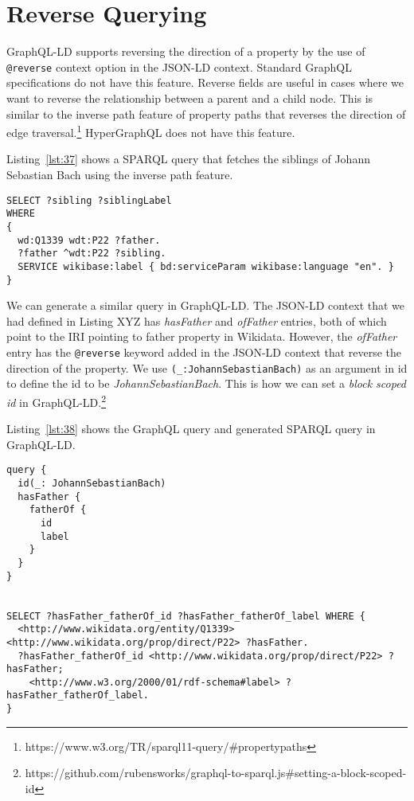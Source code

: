 \section{Reverse Querying}
\label{sec:reverse}
GraphQL-LD supports reversing the direction of a property by the use of \texttt{@reverse} context option in the JSON-LD context. Standard GraphQL specifications do not have this feature. Reverse fields are useful in cases where we want to reverse the relationship between a parent and a child node. This is similar to the inverse path feature of property paths that reverses the direction of edge traversal.\footnote{https://www.w3.org/TR/sparql11-query/\#propertypaths} HyperGraphQL does not have this feature.

Listing~\ref{lst:37} shows a SPARQL query that fetches the siblings of Johann Sebastian Bach using the inverse path feature.

\begin{minipage}{\linewidth}
\begin{lstlisting}[label=lst:37, caption={SPARQL query showing usage of inverse path}, language=SPARQL]
SELECT ?sibling ?siblingLabel
WHERE
{
  wd:Q1339 wdt:P22 ?father.
  ?father ^wdt:P22 ?sibling.
  SERVICE wikibase:label { bd:serviceParam wikibase:language "en". }
}
\end{lstlisting}
\end{minipage}

We can generate a similar query in GraphQL-LD. The JSON-LD context that we had defined in Listing XYZ has \textit{hasFather} and \textit{ofFather} entries, both of which point to the IRI pointing to father property in Wikidata. However, the \textit{ofFather} entry has the \texttt{@reverse} keyword added in the JSON-LD context that reverse the direction of the property. We use \texttt{(\_:JohannSebastianBach)} as an argument in id to define the id to be \textit{JohannSebastianBach}. This is how we can set a \textit{block scoped id} in GraphQL-LD.\footnote{https://github.com/rubensworks/graphql-to-sparql.js\#setting-a-block-scoped-id}

Listing~\ref{lst:38} shows the GraphQL query and generated SPARQL query in GraphQL-LD.

\begin{minipage}{\linewidth}
\begin{lstlisting}[columns=fullflexible, label=lst:38, caption={GraphQL query and generated SPARQL query in GraphQL-LD}, language=SPARQL]
query {
  id(_: JohannSebastianBach)
  hasFather {
  	fatherOf {
  	  id
      label
    }
  }
}


SELECT ?hasFather_fatherOf_id ?hasFather_fatherOf_label WHERE {
  <http://www.wikidata.org/entity/Q1339> <http://www.wikidata.org/prop/direct/P22> ?hasFather.
  ?hasFather_fatherOf_id <http://www.wikidata.org/prop/direct/P22> ?hasFather;
    <http://www.w3.org/2000/01/rdf-schema#label> ?hasFather_fatherOf_label.
}
\end{lstlisting}
\end{minipage}


